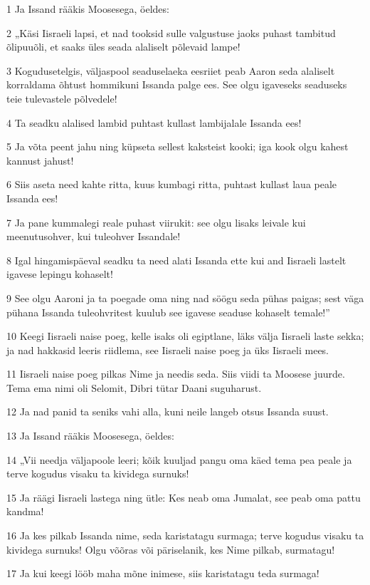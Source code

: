 \par 1 Ja Issand rääkis Moosesega, öeldes:
\par 2 „Käsi Iisraeli lapsi, et nad tooksid sulle valgustuse jaoks puhast tambitud õlipuuõli, et saaks üles seada alaliselt põlevaid lampe!
\par 3 Kogudusetelgis, väljaspool seaduselaeka eesriiet peab Aaron seda alaliselt korraldama õhtust hommikuni Issanda palge ees. See olgu igaveseks seaduseks teie tulevastele põlvedele!
\par 4 Ta seadku alalised lambid puhtast kullast lambijalale Issanda ees!
\par 5 Ja võta peent jahu ning küpseta sellest kaksteist kooki; iga kook olgu kahest kannust jahust!
\par 6 Siis aseta need kahte ritta, kuus kumbagi ritta, puhtast kullast laua peale Issanda ees!
\par 7 Ja pane kummalegi reale puhast viirukit: see olgu lisaks leivale kui meenutusohver, kui tuleohver Issandale!
\par 8 Igal hingamispäeval seadku ta need alati Issanda ette kui and Iisraeli lastelt igavese lepingu kohaselt!
\par 9 See olgu Aaroni ja ta poegade oma ning nad söögu seda pühas paigas; sest väga pühana Issanda tuleohvritest kuulub see igavese seaduse kohaselt temale!”
\par 10 Keegi Iisraeli naise poeg, kelle isaks oli egiptlane, läks välja Iisraeli laste sekka; ja nad hakkasid leeris riidlema, see Iisraeli naise poeg ja üks Iisraeli mees.
\par 11 Iisraeli naise poeg pilkas Nime ja needis seda. Siis viidi ta Moosese juurde. Tema ema nimi oli Selomit, Dibri tütar Daani suguharust.
\par 12 Ja nad panid ta seniks vahi alla, kuni neile langeb otsus Issanda suust.
\par 13 Ja Issand rääkis Moosesega, öeldes:
\par 14 „Vii needja väljapoole leeri; kõik kuuljad pangu oma käed tema pea peale ja terve kogudus visaku ta kividega surnuks!
\par 15 Ja räägi Iisraeli lastega ning ütle: Kes neab oma Jumalat, see peab oma pattu kandma!
\par 16 Ja kes pilkab Issanda nime, seda karistatagu surmaga; terve kogudus visaku ta kividega surnuks! Olgu võõras või päriselanik, kes Nime pilkab, surmatagu!
\par 17 Ja kui keegi lööb maha mõne inimese, siis karistatagu teda surmaga!
